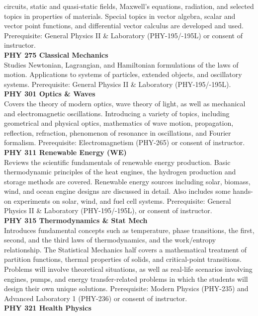 \documentclass[
  letterpaper,
]{scrbook}
\begin{document}
circuits, static and quasi-static fields, Maxwell's equations,
radiation, and selected topics in properties of materials. Special
topics in vector algebra, scalar and vector point functions, and
differential vector calculus are developed and used. Prerequisite:
General Physics II \& Laboratory (PHY-195/-195L) or consent of
instructor.\\
\textbf{PHY 275 Classical Mechanics}\\
Studies Newtonian, Lagrangian, and Hamiltonian formulations of the laws
of motion. Applications to systems of particles, extended objects, and
oscillatory systems. Prerequisite: General Physics II \& Laboratory
(PHY-195/-195L).\\
\textbf{PHY 301 Optics \& Waves}\\
Covers the theory of modern optics, wave theory of light, as well as
mechanical and electromagnetic oscillations. Introducing a variety of
topics, including geometrical and physical optics, mathematics of wave
motion, propagation, reflection, refraction, phenomenon of resonance in
oscillations, and Fourier formalism. Prerequisite: Electromagnetism
(PHY-265) or consent of instructor.\\
\textbf{PHY 311 Renewable Energy (WE)}\\
Reviews the scientific fundamentals of renewable energy production.
Basic thermodynamic principles of the heat engines, the hydrogen
production and storage methods are covered. Renewable energy sources
including solar, biomass, wind, and ocean engine designs are discussed
in detail. Also includes some hands-on experiments on solar, wind, and
fuel cell systems. Prerequisite: General Physics II \& Laboratory
(PHY-195/-195L), or consent of instructor.\\
\textbf{PHY 315 Thermodynamics \& Stat Mech}\\
Introduces fundamental concepts such as temperature, phase transitions,
the first, second, and the third laws of thermodynamics, and the
work/entropy relationship. The Statistical Mechanics half covers a
mathematical treatment of partition functions, thermal properties of
solids, and critical-point transitions. Problems will involve
theoretical situations, as well as real-life scenarios involving
engines, pumps, and energy transfer-related problems in which the
students will design their own unique solutions. Prerequisite: Modern
Physics (PHY-235) and Advanced Laboratory 1 (PHY-236) or consent of
instructor.\\
\textbf{PHY 321 Health Physics}\\
\end{document}
